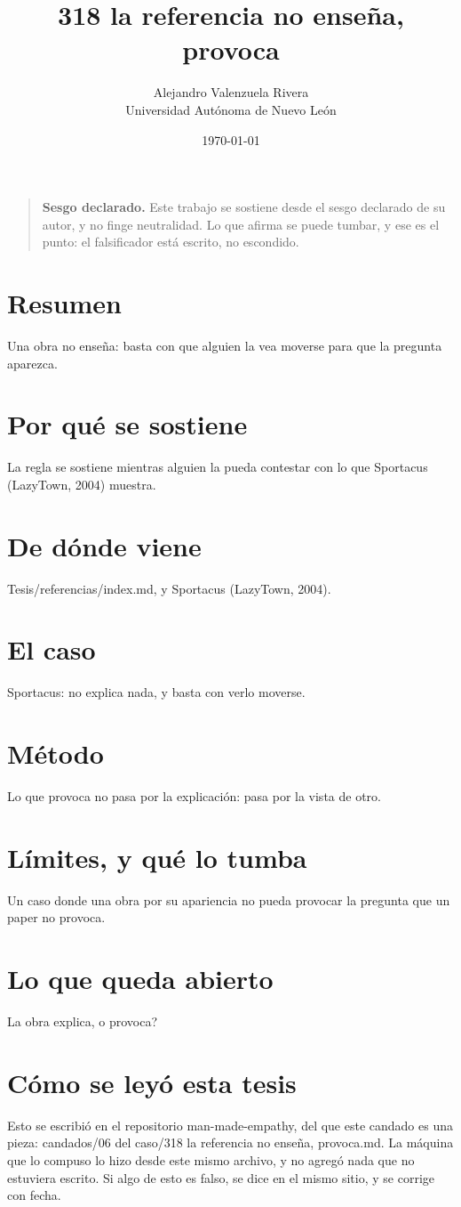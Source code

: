 \documentclass[11pt,a4paper]{article}
\title{318 la referencia no enseña, provoca}
\author{Alejandro Valenzuela Rivera\\\small Universidad Autónoma de Nuevo León}
\date{\today}
\begin{document}
\maketitle

\begin{quote}
\textbf{Sesgo declarado.} Este trabajo se sostiene desde el sesgo declarado de su autor, y no finge neutralidad. Lo que afirma se puede tumbar, y ese es el punto: el falsificador está escrito, no escondido.
\end{quote}

\section*{Resumen}
Una obra no enseña: basta con que alguien la vea moverse para que la pregunta aparezca.

\section{Por qué se sostiene}
La regla se sostiene mientras alguien la pueda contestar con lo que Sportacus (LazyTown, 2004) muestra.

\section{De dónde viene}
Tesis/referencias/index.md, y Sportacus (LazyTown, 2004).

\section{El caso}
Sportacus: no explica nada, y basta con verlo moverse.

\section{Método}
Lo que provoca no pasa por la explicación: pasa por la vista de otro.

\section{Límites, y qué lo tumba}
Un caso donde una obra por su apariencia no pueda provocar la pregunta que un paper no provoca.

\section{Lo que queda abierto}
\textquestiondown{}La obra explica, o provoca?

\section*{Cómo se leyó esta tesis}
Esto se escribió en el repositorio man-made-empathy, del que este candado es una pieza: candados/06 del caso/318 la referencia no enseña, provoca.md. La máquina que lo compuso lo hizo desde este mismo archivo, y no agregó nada que no estuviera escrito. Si algo de esto es falso, se dice en el mismo sitio, y se corrige con fecha.
\end{document}
